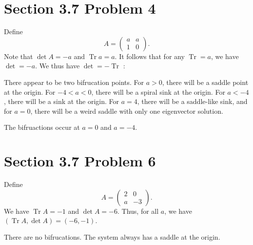 \documentclass[11pt, letterpaper]{report}
\DeclareMathOperator{\Tr}{Tr}
\begin{document}
\section*{Section 3.7 Problem 4}
Define
\[
	A=\begin{pmatrix}
		a&a\\
		1&0
	\end{pmatrix} 
.\]
Note that $\det A=-a$ and $\Tr a=a$. It follows that for any $\Tr =a$, we have $\det =-a$. We thus have $\det =-\Tr $ :
\begin{center}
\end{center}

There appear to be two bifrucation points. For $a>0$, there will be a saddle point at the origin. For $-4<a<0$, there will be a spiral sink at the origin. For $a<-4$, there will be a sink at the origin. For $a=4$, there will be a saddle-like sink, and for $a=0$, there will be a weird saddle with only one eigenvector solution.

The bifruactions occur at $a=0$ and $a=-4$.
\section*{Section 3.7 Problem 6}
Define
\[
	A=\begin{pmatrix}
		2&0\\
		a&-3
	\end{pmatrix} 
.\]
We have $\Tr A=-1$ and $\det A=-6$. Thus, for all $a$, we have $(\Tr A,\det A)=(-6,-1)$.
\begin{center}
\end{center}

There are no bifrucations. The system always has a saddle at the origin.
\end{document}

